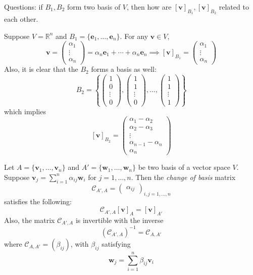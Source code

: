 \begin{example}
Questions: if $B_1,B_2$ form two basis of $V$, then how are $[\bm v]_{B_1},[\bm v]_{B_2}$ related to each other.

Suppose $V=\mathbb{R}^n$ and $B_1=\{\bm e_1,\dots,\bm e_n\}$. For any $\bm v\in V$,
\[
\bm v=\begin{pmatrix}
\alpha_1\\\vdots\\\alpha_n
\end{pmatrix}=\alpha_n\bm e_1+\cdots+\alpha_n\bm e_n
\implies
[\bm v]_{B_1}=\begin{pmatrix}
\alpha_1\\\vdots\\\alpha_n
\end{pmatrix}
\]
Also, it is clear that the $B_2$ forms a basis as well:
\[
B_2=
\left\{
\begin{pmatrix}
1\\0\\\vdots\\0
\end{pmatrix},
\begin{pmatrix}
1\\1\\\vdots\\0
\end{pmatrix},
\ldots,
\begin{pmatrix}
1\\1\\\vdots\\1
\end{pmatrix}
\right\}
\]
which implies
\[
[\bm v]_{B_2}=
\begin{pmatrix}
\alpha_1-\alpha_2\\
\alpha_2-\alpha_3\\
\vdots\\
\alpha_{n-1}-\alpha_n\\
\alpha_n
\end{pmatrix}
\]
\end{example}

\begin{proposition}
Let $A=\{\bm v_1,\dots,\bm v_n\}$ and $A'=\{\bm w_1,\dots,\bm w_n\}$ be two basis of a vector space $V$.
Suppose $\bm v_j=\sum_{i=1}^n\alpha_{ij}\bm w_i$ for $j=1,\dots,n$. Then the \emph{change of basis} matrix
\[
\mathcal{C}_{A',A}=\begin{pmatrix}
\alpha_{ij}
\end{pmatrix}_{i,j=1,\dots,n}
\]
satisfies the following:
\begin{equation}\label{Eq:3:1}
\mathcal{C}_{A',A}[\bm v]_A=[\bm v]_{A'}
\end{equation}
Also, the matrix $\mathcal{C}_{A',A}$ is invertible with the inverse
\[
(\mathcal{C}_{A',A})^{-1}=\mathcal{C}_{A,A'}
\]
where $\mathcal{C}_{A,A'}=(\beta_{ij})$, with $\beta_{ij}$ satisfying
\[
\bm w_j=\sum_{i=1}^n\beta_{ij}\bm v_i
\]
\end{proposition}

